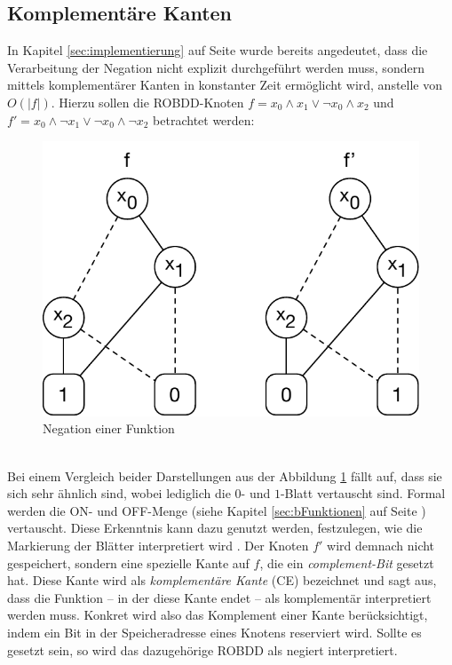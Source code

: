 \subsection{Komplementäre Kanten}
\label{sec:complementEdges}
In Kapitel \ref{sec:implementierung} auf Seite \pageref{sec:implementierung} wurde bereits angedeutet, dass die Verarbeitung der Negation nicht explizit durchgeführt werden muss, sondern mittels komplementärer Kanten in konstanter Zeit ermöglicht wird, anstelle von $O(|f|)$. Hierzu sollen die ROBDD-Knoten $f = x_0 \wedge x_1 \vee \neg x_0 \wedge x_2$ und $f' = x_0 \wedge \neg x_1 \vee \neg x_0 \wedge \neg x_2$ betrachtet werden:
\begin{figure}[bth]
	\centering
	\includegraphics[scale=0.56]{./img/neg}
	\caption[Negation einer Funktion]{Negation einer Funktion}
	\label{fig:neg}
\end{figure}\\
\noindent
Bei einem Vergleich beider Darstellungen aus der Abbildung \ref{fig:neg} fällt auf, dass sie sich sehr ähnlich sind, wobei lediglich die $0$- und $1$-Blatt vertauscht sind. Formal werden die ON- und OFF-Menge (siehe Kapitel \ref{sec:bFunktionen} auf Seite \pageref{sec:bFunktionen}) vertauscht. Diese Erkenntnis kann dazu genutzt werden, festzulegen, wie die Markierung der Blätter interpretiert wird \cite{brb2007}. Der Knoten $f'$ wird demnach nicht gespeichert, sondern eine spezielle Kante auf $f$, die ein \emph{complement-Bit} gesetzt hat. Diese Kante wird als \emph{komplementäre Kante} (CE) bezeichnet und sagt aus, dass die Funktion -- in der diese Kante endet -- als komplementär interpretiert werden muss. Konkret wird also das Komplement einer Kante berücksichtigt, indem ein Bit in der Speicheradresse eines Knotens reserviert wird. Sollte es gesetzt sein, so wird das dazugehörige ROBDD als negiert interpretiert.\\
